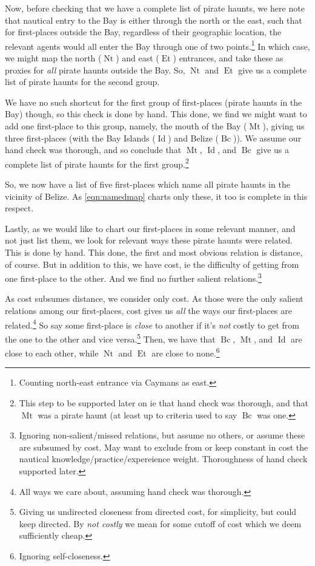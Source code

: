 \documentclass{amsart}
\newcommand{\mention}[1]{\textit{#1}} %
\DeclareMathOperator{\id}{Id} %
\DeclareMathOperator{\mt}{Mt} %
\DeclareMathOperator{\bc}{Bc} %
\DeclareMathOperator{\et}{Et} %
\DeclareMathOperator{\nt}{Nt} %
\theoremstyle{definition}
\theoremstyle{remark}
\begin{document}
			Now, before checking that we have a complete list of pirate haunts, we here note that nautical entry to the Bay is either through the north or the east, such that for first-places outside the Bay, regardless of their geographic location, the relevant agents would all enter the Bay through one of two points.\footnote{Counting north-east entrance via Caymans as east.} In which case, we might map the north (\(\nt\)) and east (\(\et\)) entrances, and take these as proxies for \emph{all} pirate haunts outside the Bay. So, \(\nt\) and \(\et\) give us a complete list of pirate haunts for the second group.
		
			We have no such shortcut for the first group of first-places (pirate haunts in the Bay) though, so this check is done by hand. This done, we find we might want to add one first-place to this group, namely, the mouth of the Bay (\(\mt\)), giving us three first-places (with the Bay Islands (\(\id\)) and Belize (\(\bc\))). We assume our hand check was thorough, and so conclude that \(\mt\), \(\id\), and \(\bc\) give us a complete list of pirate haunts for the first group.\footnote{This step to be supported later on ie that hand check was thorough, and that \(\mt\) was a pirate haunt (at least up to criteria used to say \(\bc\) was one.}
		
			So, we now have a list of five first-places which name all pirate haunts in the vicinity of Belize. As \ref{eqn:namedmap} charts only these, it too is complete in this respect.
		
			Lastly, as we would like to chart our first-places in some relevant manner, and not just list them, we look for relevant ways these pirate haunts were related. This is done by hand. This done, the first and most obvious relation is distance, of course. But in addition to this, we have cost, ie the difficulty of getting from one first-place to the other. And we find no further salient relations.\footnote{Ignoring non-salient/missed relations, but assume no others, or assume these are subsumed by cost. May want to exclude from or keep constant in cost the nautical knowledge/practice/expereience weight. Thoroughness of hand check supported later.}
			
			As cost subsumes distance, we consider only cost. As those were the only salient relations among our first-places, cost gives us \emph{all} the ways our first-places are related.\footnote{All ways we care about, assuming hand check was thorough.} So say some first-place is \mention{close} to another if it's \emph{not} costly to get from the one to the other and vice versa.\footnote{Giving us undirected closeness from directed cost, for simplicity, but could keep directed. By \mention{not costly} we mean for some cutoff of cost which we deem sufficiently cheap.} Then, we have that \(\bc\), \(\mt\), and \(\id\) are close to each other, while \(\nt\) and \(\et\) are close to none.\footnote{Ignoring self-closeness.}
			
\end{document}
